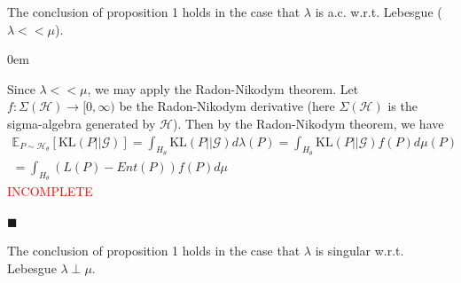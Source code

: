\documentclass[12pt]{article}
\renewcommand{\qed}{\hfill$\blacksquare$}
\renewenvironment{proof}{\begin{addmargin}[1em]{0em}\begin{newproof}}{\end{newproof}\end{addmargin}\qed}
\newenvironment{proposition}[2][Proposition]{\begin{trivlist}
\item[\hskip \labelsep {\bfseries #1}\hskip \labelsep {\bfseries #2.}]}{\end{trivlist}}
\begin{document}
\begin{proposition}{3}
    The conclusion of proposition 1 holds in the case that $\lambda$ is a.c. w.r.t. Lebesgue ($\lambda << \mu$). 
\end{proposition}

\begin{proof}
    Since $\lambda << \mu$, we may apply the Radon-Nikodym theorem. Let $f:\Sigma(\mathcal{H}) \rightarrow [0,\infty)$ be the Radon-Nikodym derivative (here $\Sigma(\mathcal{H})$ is the sigma-algebra generated by $\mathcal{H}$). Then by the Radon-Nikodym theorem, we have
    \begin{gather*}
        \mathds{E}_{P \sim \mathcal{H}_\theta}[\text{KL}(P || \mathcal{G})] = \int_{H_\theta} \text{KL}(P||\mathcal{G}) d\lambda(P) = \int_{H_\theta} \text{KL}(P||\mathcal{G}) f(P) d\mu(P) \\ 
        = \int_{H_\theta} (L(P) - Ent(P)) f(P)d\mu
    \end{gather*}
    \textcolor{red}{INCOMPLETE}
\end{proof}

\begin{proposition}{4}
    The conclusion of proposition 1 holds in the case that $\lambda$ is singular w.r.t. Lebesgue $\lambda \perp \mu$. 
\end{proposition}
\end{document}
